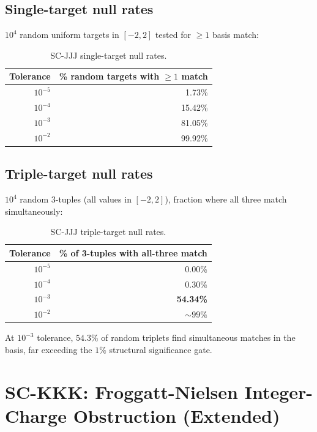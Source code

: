 \documentclass[11pt]{article}
\theoremstyle{remark}
\begin{document}
\subsection{Single-target null rates}

$10^4$ random uniform targets in $[-2,2]$ tested for $\geq1$ basis match:

\begin{table}[ht]
\centering
\caption{SC-JJJ single-target null rates.}
\begin{tabular}{rr}
\toprule
Tolerance & \% random targets with $\geq1$ match \\
\midrule
$10^{-5}$ & 1.73\% \\
$10^{-4}$ & 15.42\% \\
$10^{-3}$ & 81.05\% \\
$10^{-2}$ & 99.92\% \\
\bottomrule
\end{tabular}
\end{table}

\subsection{Triple-target null rates}

$10^4$ random 3-tuples (all values in $[-2,2]$), fraction where
all three match simultaneously:

\begin{table}[ht]
\centering
\caption{SC-JJJ triple-target null rates.}
\begin{tabular}{rr}
\toprule
Tolerance & \% of 3-tuples with all-three match \\
\midrule
$10^{-5}$ & 0.00\% \\
$10^{-4}$ & 0.30\% \\
$10^{-3}$ & \textbf{54.34\%} \\
$10^{-2}$ & $\sim99\%$ \\
\bottomrule
\end{tabular}
\end{table}

\noindent At $10^{-3}$ tolerance, $54.3\%$ of random triplets find
simultaneous matches in the basis, far exceeding the $1\%$ structural
significance gate.

\section{SC-KKK: Froggatt-Nielsen Integer-Charge Obstruction (Extended)}
\label{sec:si_kkk}
\end{document}
